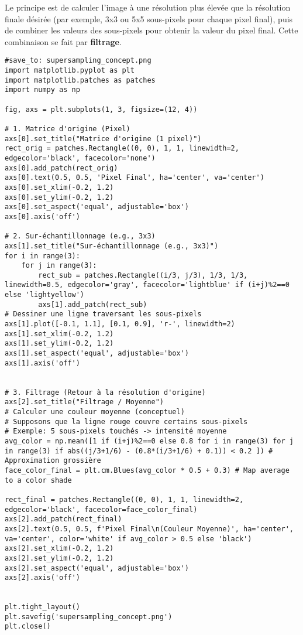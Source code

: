 \documentclass{article}
\begin{document}
Le principe est de calculer l'image à une résolution plus élevée que la résolution finale désirée (par exemple, 3x3 ou 5x5 sous-pixels pour chaque pixel final), puis de combiner les valeurs des sous-pixels pour obtenir la valeur du pixel final. Cette combinaison se fait par \textbf{filtrage}.

\begin{verbatim}
#save_to: supersampling_concept.png
import matplotlib.pyplot as plt
import matplotlib.patches as patches
import numpy as np

fig, axs = plt.subplots(1, 3, figsize=(12, 4))

# 1. Matrice d'origine (Pixel)
axs[0].set_title("Matrice d'origine (1 pixel)")
rect_orig = patches.Rectangle((0, 0), 1, 1, linewidth=2, edgecolor='black', facecolor='none')
axs[0].add_patch(rect_orig)
axs[0].text(0.5, 0.5, 'Pixel Final', ha='center', va='center')
axs[0].set_xlim(-0.2, 1.2)
axs[0].set_ylim(-0.2, 1.2)
axs[0].set_aspect('equal', adjustable='box')
axs[0].axis('off')

# 2. Sur-échantillonnage (e.g., 3x3)
axs[1].set_title("Sur-échantillonnage (e.g., 3x3)")
for i in range(3):
    for j in range(3):
        rect_sub = patches.Rectangle((i/3, j/3), 1/3, 1/3, linewidth=0.5, edgecolor='gray', facecolor='lightblue' if (i+j)%2==0 else 'lightyellow')
        axs[1].add_patch(rect_sub)
# Dessiner une ligne traversant les sous-pixels
axs[1].plot([-0.1, 1.1], [0.1, 0.9], 'r-', linewidth=2)
axs[1].set_xlim(-0.2, 1.2)
axs[1].set_ylim(-0.2, 1.2)
axs[1].set_aspect('equal', adjustable='box')
axs[1].axis('off')


# 3. Filtrage (Retour à la résolution d'origine)
axs[2].set_title("Filtrage / Moyenne")
# Calculer une couleur moyenne (conceptuel)
# Supposons que la ligne rouge couvre certains sous-pixels
# Exemple: 5 sous-pixels touchés -> intensité moyenne
avg_color = np.mean([1 if (i+j)%2==0 else 0.8 for i in range(3) for j in range(3) if abs((j/3+1/6) - (0.8*(i/3+1/6) + 0.1)) < 0.2 ]) # Approximation grossière
face_color_final = plt.cm.Blues(avg_color * 0.5 + 0.3) # Map average to a color shade

rect_final = patches.Rectangle((0, 0), 1, 1, linewidth=2, edgecolor='black', facecolor=face_color_final)
axs[2].add_patch(rect_final)
axs[2].text(0.5, 0.5, f'Pixel Final\n(Couleur Moyenne)', ha='center', va='center', color='white' if avg_color > 0.5 else 'black')
axs[2].set_xlim(-0.2, 1.2)
axs[2].set_ylim(-0.2, 1.2)
axs[2].set_aspect('equal', adjustable='box')
axs[2].axis('off')


plt.tight_layout()
plt.savefig('supersampling_concept.png')
plt.close()
\end{verbatim}
\end{document}
